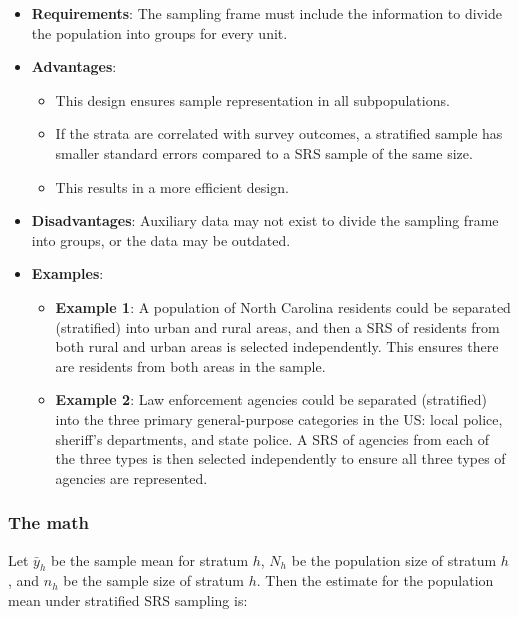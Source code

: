 \documentclass[
]{krantz}
\providecommand{\tightlist}{%
  \setlength{\itemsep}{0pt}\setlength{\parskip}{0pt}}
\begin{document}
\begin{itemize}
\tightlist
\item
  \textbf{Requirements}: The sampling frame must include the information to divide the population into groups for every unit.
\item
  \textbf{Advantages}:

  \begin{itemize}
  \tightlist
  \item
    This design ensures sample representation in all subpopulations.
  \item
    If the strata are correlated with survey outcomes, a stratified sample has smaller standard errors compared to a SRS sample of the same size.\\
  \item
    This results in a more efficient design.
  \end{itemize}
\item
  \textbf{Disadvantages}: Auxiliary data may not exist to divide the sampling frame into groups, or the data may be outdated.
\item
  \textbf{Examples}:

  \begin{itemize}
  \tightlist
  \item
    \textbf{Example 1}: A population of North Carolina residents could be separated (stratified) into urban and rural areas, and then a SRS of residents from both rural and urban areas is selected independently. This ensures there are residents from both areas in the sample.
  \item
    \textbf{Example 2}: Law enforcement agencies could be separated (stratified) into the three primary general-purpose categories in the US: local police, sheriff's departments, and state police. A SRS of agencies from each of the three types is then selected independently to ensure all three types of agencies are represented.
  \end{itemize}
\end{itemize}

\hypertarget{the-math-2}{%
\subsubsection*{The math}\label{the-math-2}}


Let \(\bar{y}_h\) be the sample mean for stratum \(h\), \(N_h\) be the population size of stratum \(h\), and \(n_h\) be the sample size of stratum \(h\). Then the estimate for the population mean under stratified SRS sampling is:
\end{document}
